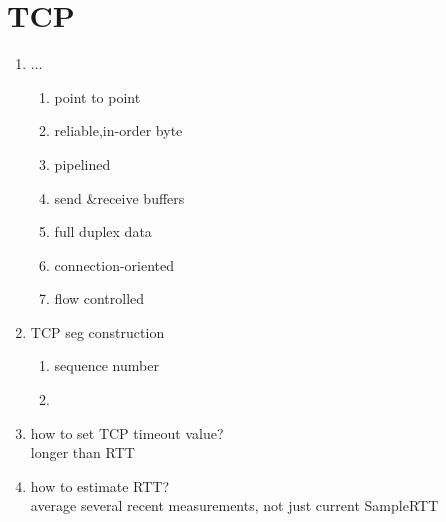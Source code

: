 \documentclass[UTF8]{article}
\begin{document}
	\section{TCP}
	\begin{enumerate}
		\item ...
		\begin{enumerate}
			\item point to point
			\item reliable,in-order byte
			\item pipelined
			\item send \&receive buffers
			\item full duplex data
			\item connection-oriented
			\item flow controlled
		\end{enumerate}
		\item TCP seg construction
		\begin{enumerate}
			\item sequence number
			\item 
		\end{enumerate}
		\item how to set TCP timeout value?\\
		longer than RTT 
		\item how to estimate RTT?\\
		average several recent measurements, not just current SampleRTT
	\end{enumerate}
	
\end{document}
